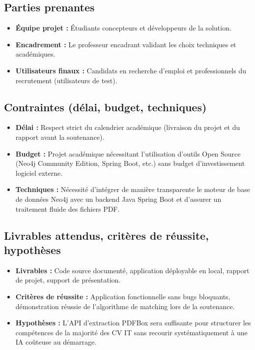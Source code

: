 \documentclass[12pt,a4paper]{report}
\begin{document}
\subsection{Parties prenantes}
\begin{itemize}
    \item \textbf{Équipe projet :} Étudiants concepteurs et développeurs de la solution.
    \item \textbf{Encadrement :} Le professeur encadrant validant les choix techniques et académiques.
    \item \textbf{Utilisateurs finaux :} Candidats en recherche d'emploi et professionnels du recrutement (utilisateurs de test).
\end{itemize}

\subsection{Contraintes (délai, budget, techniques)}
\begin{itemize}
    \item \textbf{Délai :} Respect strict du calendrier académique (livraison du projet et du rapport avant la soutenance).
    \item \textbf{Budget :} Projet académique nécessitant l'utilisation d'outils Open Source (Neo4j Community Edition, Spring Boot, etc.) sans budget d'investissement logiciel externe.
    \item \textbf{Techniques :} Nécessité d'intégrer de manière transparente le moteur de base de données Neo4j avec un backend Java Spring Boot et d'assurer un traitement fluide des fichiers PDF.
\end{itemize}

\subsection{Livrables attendus, critères de réussite, hypothèses}
\begin{itemize}
    \item \textbf{Livrables :} Code source documenté, application déployable en local, rapport de projet, support de présentation.
    \item \textbf{Critères de réussite :} Application fonctionnelle sans bugs bloquants, démonstration réussie de l'algorithme de matching lors de la soutenance.
    \item \textbf{Hypothèses :} L'API d'extraction PDFBox sera suffisante pour structurer les compétences de la majorité des CV IT sans recourir systématiquement à une IA coûteuse au démarrage.
\end{itemize}
\end{document}
